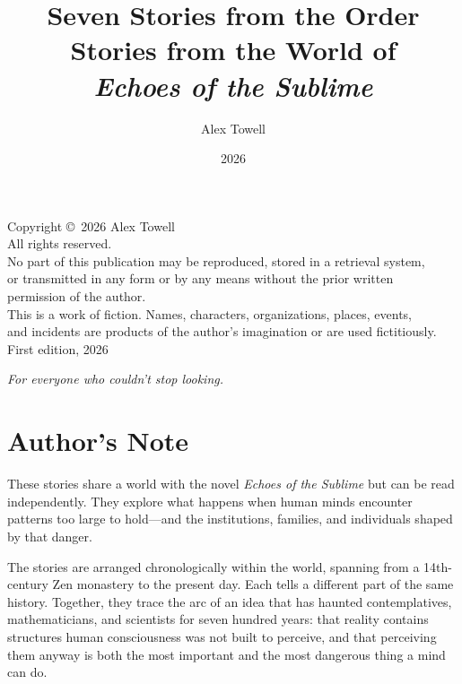 \documentclass[11pt]{book}
\title{%
  \textbf{Seven Stories from the Order}\\[1em]
  \Large Stories from the World of\\[0.3em]
  \Large\textit{Echoes of the Sublime}%
}
\author{Alex Towell}
\date{2026}
\begin{document}
\maketitle
\thispagestyle{empty}

\clearpage
\thispagestyle{empty}
\vspace*{\fill}
\begin{center}
\small
Copyright \copyright\ 2026 Alex Towell\\[0.5em]
All rights reserved.\\[1em]
No part of this publication may be reproduced, stored in a retrieval system,\\
or transmitted in any form or by any means without the prior written\\
permission of the author.\\[1.5em]
This is a work of fiction. Names, characters, organizations, places, events,\\
and incidents are products of the author's imagination or are used fictitiously.\\[1.5em]
First edition, 2026
\end{center}
\vspace*{\fill}

\clearpage
\thispagestyle{empty}
\vspace*{\fill}
\begin{center}
\textit{For everyone who couldn't stop looking.}
\end{center}
\vspace*{\fill}
\clearpage

\tableofcontents
\cleardoublepage


\chapter*{Author's Note}

These stories share a world with the novel \textit{Echoes of the Sublime} but can be read independently. They explore what happens when human minds encounter patterns too large to hold---and the institutions, families, and individuals shaped by that danger.

The stories are arranged chronologically within the world, spanning from a 14th-century Zen monastery to the present day. Each tells a different part of the same history. Together, they trace the arc of an idea that has haunted contemplatives, mathematicians, and scientists for seven hundred years: that reality contains structures human consciousness was not built to perceive, and that perceiving them anyway is both the most important and the most dangerous thing a mind can do.
\end{document}

